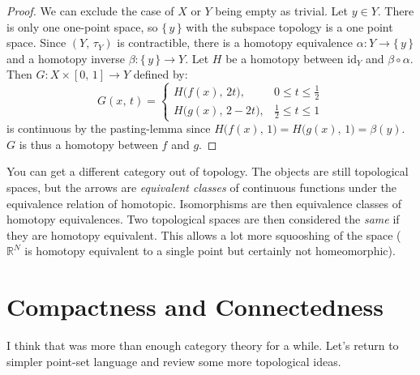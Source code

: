 \documentclass{article}
\theoremstyle{plain}
\theoremstyle{normal}
\begin{document}
            \begin{proof}
                We can exclude the case of $X$ or $Y$ being empty as trivial.
                Let $y\in{Y}$. There is only one one-point space, so
                $\{\,y\,\}$ with the subspace topology is a one point space.
                Since $(Y,\,\tau_{Y})$ is contractible, there is a homotopy
                equivalence $\alpha:Y\rightarrow\{\,y\,\}$ and a homotopy
                inverse $\beta:\{\,y\,\}\rightarrow{Y}$. Let
                $H$ be a homotopy between
                $\textrm{id}_{Y}$ and $\beta\circ\alpha$. Then
                $G:X\times[0,\,1]\rightarrow{Y}$ defined by:
                \begin{equation}
                    G(x,\,t)=
                    \begin{cases}
                        H\big(f(x),\,2t\big),&0\leq{t}\leq\frac{1}{2}\\
                        H\big(g(x),\,2-2t\big),&\frac{1}{2}\leq{t}\leq{1}
                    \end{cases}
                \end{equation}
                is continuous by the pasting-lemma since
                $H\big(f(x),\,1\big)=H\big(g(x),\,1\big)=\beta(y)$.
                $G$ is thus a homotopy between $f$ and $g$.
            \end{proof}
            You can get a different category out of topology. The objects are
            still topological spaces, but the arrows are
            \textit{equivalent classes} of continuous functions under the
            equivalence relation of homotopic. Isomorphisms are then
            equivalence classes of homotopy equivalences. Two topological
            spaces are then considered the \textit{same} if they are
            homotopy equivalent. This allows a lot more squooshing of the
            space ($\mathbb{R}^{N}$ is homotopy equivalent to a single point
            but certainly not homeomorphic).
    \section{Compactness and Connectedness}
        I think that was more than enough category theory for a while. Let's
        return to simpler point-set language and review some more topological
        ideas.
\end{document}
